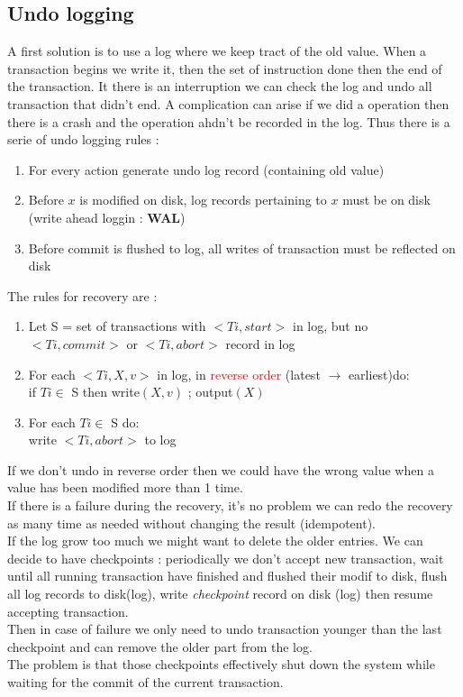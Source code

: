 \documentclass[12pt,a4paper]{article}
\begin{document}
\subsection{Undo logging}
A first solution is to use a log where we keep tract of the old value. When a transaction begins we write it, then the set of instruction done then the end of the transaction. It there is an interruption we can check the log and undo all transaction that didn't end. A complication can arise if we did a operation then there is a crash and the operation ahdn't be recorded in the log. Thus there is a serie of undo logging rules :
\begin{enumerate}
\item For every action generate undo log record (containing old value)
\item Before $x$ is modified on disk, log records pertaining to $x$ must be on disk (write ahead loggin : \textbf{WAL})
\item Before commit is flushed to log, all writes of transaction must be reflected on disk
\end{enumerate}
The rules for recovery are :
\begin{enumerate}
\item Let S =  set of transactions with $<Ti, start>$ in log, but no $<Ti, commit>$ or $<Ti,abort>$ record in log
\item For each $<Ti,X,v>$ in log, in \textcolor{red}{reverse order} (latest $\rightarrow$ earliest)do:\\
if $Ti \in$ S then {write$(X,v)$ ; output$(X)$}
\item For each $Ti \in$ S do:\\
write $<Ti,abort>$ to log
\end{enumerate}
If we don't undo in reverse order then we could have the wrong value when a value has been modified more than 1 time.\\
If there is a failure during the recovery, it's no problem we can redo the recovery as many time as needed without changing the result (idempotent).\\

If the log grow too much we might want to delete the older entries. We can decide to have checkpoints : periodically we don't accept new transaction, wait until all running transaction have finished and flushed their modif to disk, flush all log records to disk(log), write \textit{checkpoint} record on disk (log) then resume accepting transaction.\\
Then in case of failure we only need to undo transaction younger than the last checkpoint and can remove the older part from the log.\\
The problem is that those checkpoints effectively shut down the system while waiting for the commit of the current transaction.\\
\end{document}
